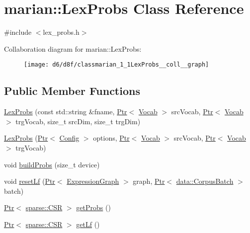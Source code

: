 \hypertarget{classmarian_1_1LexProbs}{}\section{marian\+:\+:Lex\+Probs Class Reference}
\label{classmarian_1_1LexProbs}


{\ttfamily \#include $<$lex\+\_\+probs.\+h$>$}



Collaboration diagram for marian\+:\+:Lex\+Probs\+:
\nopagebreak
\begin{figure}[H]
\begin{center}
\leavevmode
\texttt{[image: d6/d8f/classmarian\_1\_1LexProbs\_\_coll\_\_graph]}
\end{center}
\end{figure}
\subsection*{Public Member Functions}
\begin{DoxyCompactItemize}
\item 
\hyperlink{classmarian_1_1LexProbs_a3e3cf041f4c478e6bc3b82018070302f}{Lex\+Probs} (const std\+::string \&fname, \hyperlink{namespacemarian_ad1a373be43a00ef9ce35666145137b08}{Ptr}$<$ \hyperlink{classmarian_1_1Vocab}{Vocab} $>$ src\+Vocab, \hyperlink{namespacemarian_ad1a373be43a00ef9ce35666145137b08}{Ptr}$<$ \hyperlink{classmarian_1_1Vocab}{Vocab} $>$ trg\+Vocab, size\+\_\+t src\+Dim, size\+\_\+t trg\+Dim)
\item 
\hyperlink{classmarian_1_1LexProbs_aeb1ccb2cc1b340733bbcb3fe082b66fc}{Lex\+Probs} (\hyperlink{namespacemarian_ad1a373be43a00ef9ce35666145137b08}{Ptr}$<$ \hyperlink{classmarian_1_1Config}{Config} $>$ options, \hyperlink{namespacemarian_ad1a373be43a00ef9ce35666145137b08}{Ptr}$<$ \hyperlink{classmarian_1_1Vocab}{Vocab} $>$ src\+Vocab, \hyperlink{namespacemarian_ad1a373be43a00ef9ce35666145137b08}{Ptr}$<$ \hyperlink{classmarian_1_1Vocab}{Vocab} $>$ trg\+Vocab)
\item 
void \hyperlink{classmarian_1_1LexProbs_aace10e92c706a3ddc6706fc8bb91b97b}{build\+Probs} (size\+\_\+t device)
\item 
void \hyperlink{classmarian_1_1LexProbs_a4d958aee140ae2db31f96dd82cc22137}{reset\+Lf} (\hyperlink{namespacemarian_ad1a373be43a00ef9ce35666145137b08}{Ptr}$<$ \hyperlink{classmarian_1_1ExpressionGraph}{Expression\+Graph} $>$ graph, \hyperlink{namespacemarian_ad1a373be43a00ef9ce35666145137b08}{Ptr}$<$ \hyperlink{classmarian_1_1data_1_1CorpusBatch}{data\+::\+Corpus\+Batch} $>$ batch)
\item 
\hyperlink{namespacemarian_ad1a373be43a00ef9ce35666145137b08}{Ptr}$<$ \hyperlink{classmarian_1_1sparse_1_1CSR}{sparse\+::\+C\+SR} $>$ \hyperlink{classmarian_1_1LexProbs_a02856f8d11871c723acafeab1d8ecde5}{get\+Probs} ()
\item 
\hyperlink{namespacemarian_ad1a373be43a00ef9ce35666145137b08}{Ptr}$<$ \hyperlink{classmarian_1_1sparse_1_1CSR}{sparse\+::\+C\+SR} $>$ \hyperlink{classmarian_1_1LexProbs_a890317e54a6416a4a4afe8d906dd2a92}{get\+Lf} ()
\end{DoxyCompactItemize}
